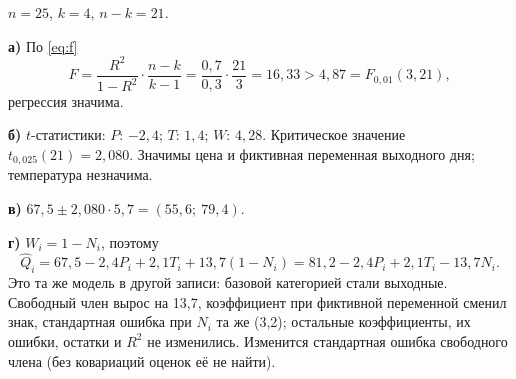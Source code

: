 \begin{solution}
$n = 25$, $k = 4$, $n - k = 21$.

\medskip
\textbf{а)} По \eqref{eq:f}
\[
  F = \frac{R^2}{1-R^2}\cdot\frac{n-k}{k-1} = \frac{0{,}7}{0{,}3}\cdot\frac{21}{3}
    = 16{,}33 > 4{,}87 = F_{0{,}01}(3, 21),
\]
регрессия значима.

\medskip
\textbf{б)} $t$-статистики: $P$: $-2{,}4$; $T$: $1{,}4$; $W$: $4{,}28$.
Критическое значение $t_{0{,}025}(21) = 2{,}080$. Значимы цена и фиктивная
переменная выходного дня; температура незначима.

\medskip
\textbf{в)} $67{,}5 \pm 2{,}080\cdot 5{,}7 = (55{,}6;\ 79{,}4)$.

\medskip
\textbf{г)} $W_i = 1 - N_i$, поэтому
\[
  \widehat{Q}_i = 67{,}5 - 2{,}4P_i + 2{,}1T_i + 13{,}7(1 - N_i)
               = 81{,}2 - 2{,}4P_i + 2{,}1T_i - 13{,}7N_i .
\]
Это та же модель в другой записи: базовой категорией стали выходные. Свободный
член вырос на 13,7, коэффициент при фиктивной переменной сменил знак,
стандартная ошибка при $N_i$ та же (3,2); остальные коэффициенты, их ошибки,
остатки и $R^2$ не изменились. Изменится стандартная ошибка свободного члена
(без ковариаций оценок её не найти).
\end{solution}


